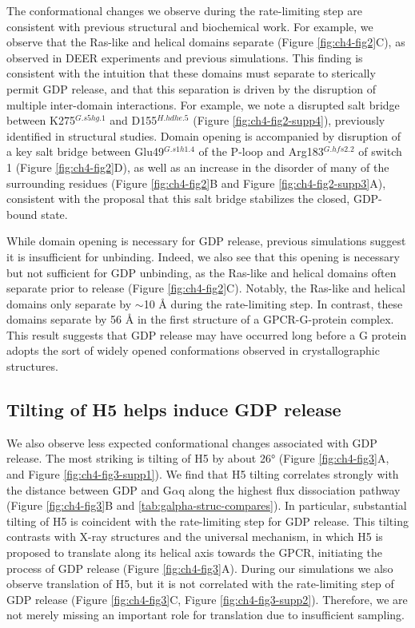 \documentclass[../main.tex]{subfiles}
\begin{document}
        The conformational changes we observe during the rate-limiting step are consistent with previous structural and biochemical work. For example, we observe that the Ras-like and helical domains separate (Figure \ref{fig:ch4-fig2}C), as observed in DEER experiments\cite{VanEps:2011hb} and previous simulations\cite{Dror:2015bg}. This finding is consistent with the intuition that these domains must separate to sterically permit GDP release, and that this separation is driven by the disruption of multiple inter-domain interactions. For example, we note a disrupted salt bridge between K275$^{G.s5hg.1}$ and D155$^{H.hdhe.5}$ (Figure \ref{fig:ch4-fig2-supp4}), previously identified in structural studies\cite{Flock:2015dj}. Domain opening is accompanied by disruption of a key salt bridge between Glu49$^{G.s1h1.4}$ of the P-loop and Arg183$^{G.hfs2.2}$ of switch 1 (Figure \ref{fig:ch4-fig2}D), as well as an increase in the disorder of many of the surrounding residues (Figure \ref{fig:ch4-fig2}B and Figure \ref{fig:ch4-fig2-supp3}A), consistent with the proposal that this salt bridge stabilizes the closed, GDP-bound state\cite{Liang:2017cz}.

        While domain opening is necessary for GDP release, previous simulations suggest it is insufficient for unbinding\cite{Dror:2015bg}. Indeed, we also see that this opening is necessary but not sufficient for GDP unbinding, as the Ras-like and helical domains often separate prior to release (Figure \ref{fig:ch4-fig2}C). Notably, the Ras-like and helical domains only separate by $\sim$10 \AA{} during the rate-limiting step. In contrast, these domains separate by 56 \AA{} in the first structure of a GPCR-G-protein complex. This result suggests that GDP release may have occurred long before a G protein adopts the sort of widely opened conformations observed in crystallographic structures\cite{Rasmussen:2011kp}.

    \subsection{Tilting of H5 helps induce GDP release}
        We also observe less expected conformational changes associated with GDP release. The most striking is tilting of H5 by about 26° (Figure \ref{fig:ch4-fig3}A, and Figure \ref{fig:ch4-fig3-supp1}). We find that H5 tilting correlates strongly with the distance between GDP and G$\alpha$q along the highest flux dissociation pathway (Figure \ref{fig:ch4-fig3}B and \ref{tab:galpha-struc-compares}). In particular, substantial tilting of H5 is coincident with the rate-limiting step for GDP release. This tilting contrasts with X-ray structures and the universal mechanism, in which H5 is proposed to translate along its helical axis towards the GPCR, initiating the process of GDP release (Figure \ref{fig:ch4-fig3}A). During our simulations we also observe translation of H5, but it is not correlated with the rate-limiting step of GDP release (Figure \ref{fig:ch4-fig3}C, Figure \ref{fig:ch4-fig3-supp2}). Therefore, we are not merely missing an important role for translation due to insufficient sampling.
\end{document}
